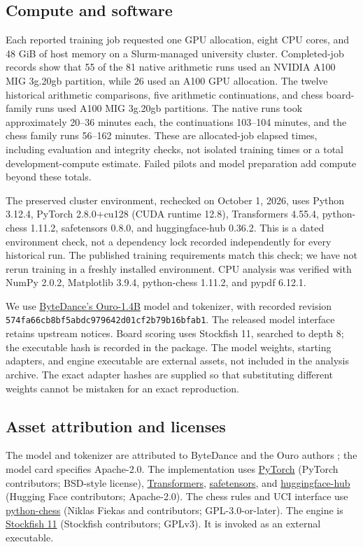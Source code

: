 \subsection{Compute and software}\label{app:compute}
Each reported training job requested one GPU allocation, eight CPU cores, and 48 GiB of host memory on a Slurm-managed university cluster. Completed-job records show that 55 of the 81 native arithmetic runs used an NVIDIA A100 MIG 3g.20gb partition, while 26 used an A100 GPU allocation. The twelve historical arithmetic comparisons, five arithmetic continuations, and chess board-family runs used A100 MIG 3g.20gb partitions. The native runs took approximately 20--36 minutes each, the continuations 103--104 minutes, and the chess family runs 56--162 minutes. These are allocated-job elapsed times, including evaluation and integrity checks, not isolated training times or a total development-compute estimate. Failed pilots and model preparation add compute beyond these totals.

The preserved cluster environment, rechecked on October 1, 2026, uses Python 3.12.4, PyTorch 2.8.0+cu128 (CUDA runtime 12.8), Transformers 4.55.4, python-chess 1.11.2, safetensors 0.8.0, and huggingface-hub 0.36.2. This is a dated environment check, not a dependency lock recorded independently for every historical run. The published training requirements match this check; we have not rerun training in a freshly installed environment. CPU analysis was verified with NumPy 2.0.2, Matplotlib 3.9.4, python-chess 1.11.2, and pypdf 6.12.1.

We use \href{https://huggingface.co/ByteDance/Ouro-1.4B}{ByteDance's Ouro-1.4B} model and tokenizer, with recorded revision \texttt{574fa66cb8bf5abdc979642d01cf2b79b16bfab1}. The released model interface retains upstream notices. Board scoring uses Stockfish 11, searched to depth 8; the executable hash is recorded in the package. The model weights, starting adapters, and engine executable are external assets, not included in the analysis archive. The exact adapter hashes are supplied so that substituting different weights cannot be mistaken for an exact reproduction.

\subsection{Asset attribution and licenses}\label{app:assets}
The model and tokenizer are attributed to ByteDance and the Ouro authors \citep{zhu2025}; the model card specifies Apache-2.0. The implementation uses \href{https://pytorch.org/}{PyTorch} (PyTorch contributors; BSD-style license), \href{https://github.com/huggingface/transformers}{Transformers}, \href{https://github.com/huggingface/safetensors}{safetensors}, and \href{https://github.com/huggingface/huggingface_hub}{huggingface-hub} (Hugging Face contributors; Apache-2.0). The chess rules and UCI interface use \href{https://github.com/niklasf/python-chess}{python-chess} (Niklas Fiekas and contributors; GPL-3.0-or-later). The engine is \href{https://github.com/official-stockfish/Stockfish/tree/sf_11}{Stockfish 11} (Stockfish contributors; GPLv3). It is invoked as an external executable.

